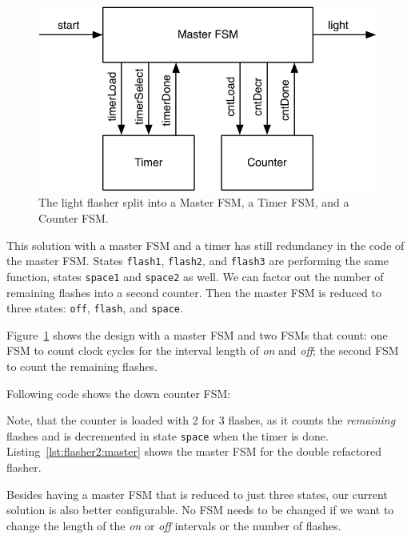 \documentclass[%
    10pt,
    headinclude, footexclude,
    openright, %
    notitlepage,
    cleardoubleempty,
    headsepline,
    pointlessnumbers,
    bibtotoc, idxtotoc,
    ]{scrbook}
\newcommand{\code}[1]{{\small{\texttt{#1}}}}
\newcommand{\scale}{0.7}
\begin{document}
\begin{figure}
  \centering
  \includegraphics[scale=\scale]{figures/flasher2}
  \caption{The light flasher split into a Master FSM, a Timer FSM, and a Counter FSM.}
  \label{fig:flasher2}
\end{figure}

This solution with a master FSM and a timer has still redundancy in the code
of the master FSM. States \code{flash1}, \code{flash2}, and \code{flash3}
are performing the same function, states \code{space1} and \code{space2} as well.
We can factor out the number of remaining flashes into a second counter.
Then the master FSM is reduced to three states: \code{off}, \code{flash},
and \code{space}.

Figure~\ref{fig:flasher2} shows the design with a master FSM and two FSMs
that count: one FSM to count clock cycles for the interval length of \emph{on}
and \emph{off}; the second FSM to count the remaining flashes.

Following code shows the down counter FSM:


\noindent Note, that the counter is loaded with 2 for 3 flashes, as it counts the
\emph{remaining} flashes and is decremented in state \code{space} when the timer
is done. Listing~\ref{lst:flasher2:master} shows the master FSM for the double refactored flasher.


Besides having a master FSM that is reduced to just three states, our current solution
is also better configurable. No FSM needs to be changed if we want to change
the length of the \emph{on} or \emph{off} intervals or the number of flashes.
\end{document}
